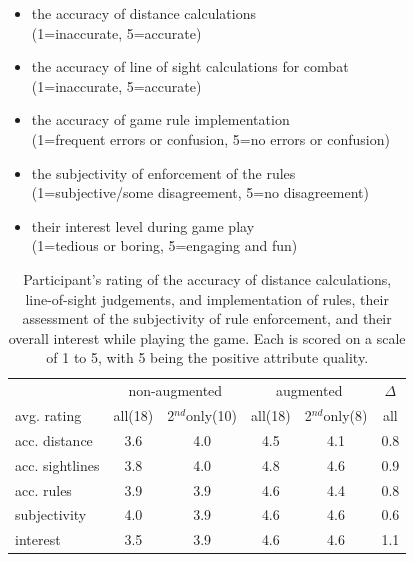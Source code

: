 \documentclass[review]{vgtc}                 %
\begin{document}
\begin{itemize}

\item the accuracy of distance calculations \\(1=inaccurate, 5=accurate)\vspace{-0.1in}
\item the accuracy of line of sight calculations for combat \\(1=inaccurate, 5=accurate)\vspace{-0.1in}
\item the accuracy of game rule implementation \\(1=frequent errors or confusion, 5=no errors or confusion)\vspace{-0.1in}
\item the subjectivity of enforcement of the rules \\(1=subjective/some disagreement, 5=no disagreement)\vspace{-0.1in}
\item their interest level during game play \\(1=tedious or boring, 5=engaging and fun)\vspace{-0.1in}

\end{itemize}

\begin{table}[tb]
\begin{center}
\begin{tabular}{@{}l|c@{~}c|c@{~}c|c@{}}
                & \multicolumn{2}{c|}{non-augmented} & \multicolumn{2}{c|}{augmented} & $\Delta$ \\
avg. rating     & all(18) & 2$^{nd}$only(10) & all(18) & 2$^{nd}$only(8) & all \\ \hline
acc. distance   & 3.6 & 4.0 & 4.5 & 4.1 & 0.8 \\
acc. sightlines & 3.8 & 4.0 & 4.8 & 4.6 & 0.9 \\
acc. rules      & 3.9 & 3.9 & 4.6 & 4.4 & 0.8 \\
subjectivity    & 4.0 & 3.9 & 4.6 & 4.6 & 0.6 \\
interest        & 3.5 & 3.9 & 4.6 & 4.6 & 1.1 \\
\end{tabular}
\end{center}%
\vspace{-0.15in}
\caption{Participant's rating of the accuracy of distance
  calculations, line-of-sight judgements, and implementation of rules,
  their assessment of the subjectivity of rule enforcement, and their
  overall interest while playing the game.  Each is scored on a scale
  of 1 to 5, with 5 being the positive attribute quality.
\label{table:timing_questionnaire}
\vspace{-0.1in}
}
\end{table}
\end{document}
